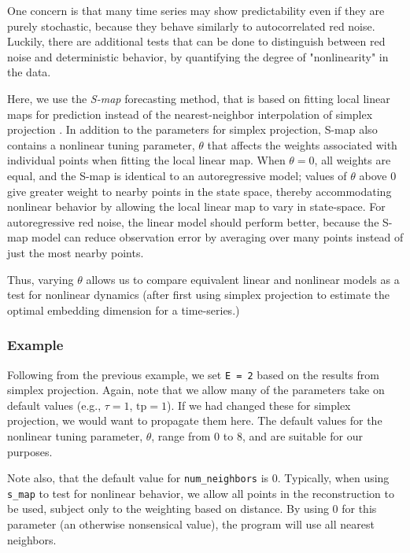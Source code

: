 One concern is that many time series may show predictability even if they are purely stochastic, because they behave similarly to autocorrelated red noise. Luckily, there are additional tests that can be done to distinguish between red noise and deterministic behavior, by quantifying the degree of "nonlinearity" in the data.

Here, we use the \emph{S-map} forecasting method, that is based on fitting local linear maps for prediction instead of the nearest-neighbor interpolation of simplex projection \cite{Sugihara_1994}. In addition to the parameters for simplex projection, S-map also contains a nonlinear tuning parameter, $\theta$ that affects the weights associated with individual points when fitting the local linear map. When $\theta = 0$, all weights are equal, and the S-map is identical to an autoregressive model; values of $\theta$ above $0$ give greater weight to nearby points in the state space, thereby accommodating nonlinear behavior by allowing the local linear map to vary in state-space. For autoregressive red noise, the linear model should perform better, because the S-map model can reduce observation error by averaging over many points instead of just the most nearby points.

Thus, varying $\theta$ allows us to compare equivalent linear and nonlinear models as a test for nonlinear dynamics (after first using simplex projection to estimate the optimal embedding dimension for a time-series.) 

\subsubsection{Example}

Following from the previous example, we set \lstinline{E = 2} based on the results from simplex projection. Again, note that we allow many of the parameters take on default values (e.g., $\tau = 1$, $\text{tp} = 1$). If we had changed these for simplex projection, we would want to propagate them here. The default values for the nonlinear tuning parameter, $\theta$, range from $0$ to $8$, and are suitable for our purposes.

Note also, that the default value for \lstinline{num_neighbors} is 0. Typically, when using \lstinline{s_map} to test for nonlinear behavior, we allow all points in the reconstruction to be used, subject only to the weighting based on distance. By using 0 for this parameter (an otherwise nonsensical value), the program will use all nearest neighbors.


